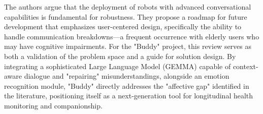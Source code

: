 The authors argue that the deployment of robots with advanced conversational capabilities is fundamental for robustness. They propose a roadmap for future development that emphasizes user-centered design, specifically the ability to handle communication breakdowns—a frequent occurrence with elderly users who may have cognitive impairments. For the "Buddy" project, this review serves as both a validation of the problem space and a guide for solution design. By integrating a sophisticated Large Language Model (GEMMA) capable of context-aware dialogue and "repairing" misunderstandings, alongside an emotion recognition module, "Buddy" directly addresses the "affective gap" identified in the literature, positioning itself as a next-generation tool for longitudinal health monitoring and companionship.
